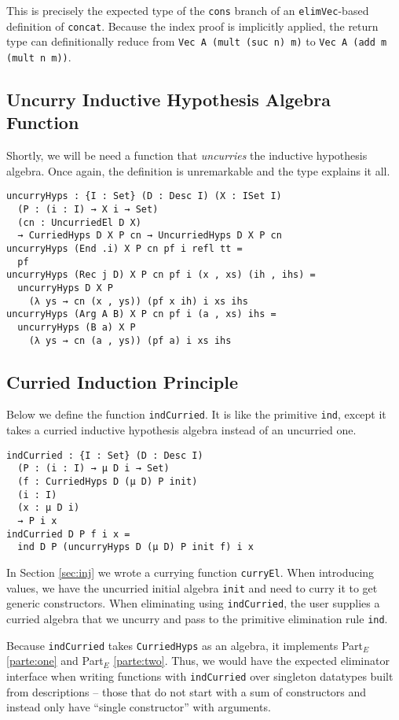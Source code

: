 \documentclass[nonatbib]{sigplanconf}
\newcommand{\refsec}[1]{Section \ref{sec:#1}}
\newcommand{\refparte}[1]{Part$_E$ \ref{parte:#1}}
\begin{document}
This is precisely the expected type of the {\tt cons} branch of
an {\tt elimVec}-based definition of {\tt concat}. Because the index
proof is implicitly applied, the return type can definitionally
reduce from {\tt Vec A (mult (suc n) m)}
to {\tt Vec A (add m (mult n m))}.

\subsection{Uncurry Inductive Hypothesis Algebra Function}

Shortly, we will be need a function that {\it uncurries} the inductive
hypothesis algebra. Once again, the definition is unremarkable and the
type explains it all.

\begin{verbatim}
uncurryHyps : {I : Set} (D : Desc I) (X : ISet I)
  (P : (i : I) → X i → Set)
  (cn : UncurriedEl D X)
  → CurriedHyps D X P cn → UncurriedHyps D X P cn
uncurryHyps (End .i) X P cn pf i refl tt =
  pf
uncurryHyps (Rec j D) X P cn pf i (x , xs) (ih , ihs) =
  uncurryHyps D X P
    (λ ys → cn (x , ys)) (pf x ih) i xs ihs
uncurryHyps (Arg A B) X P cn pf i (a , xs) ihs =
  uncurryHyps (B a) X P
    (λ ys → cn (a , ys)) (pf a) i xs ihs
\end{verbatim}

\subsection{Curried Induction Principle}

Below we define
the function {\tt indCurried}. It is like the primitive {\tt ind},
except it takes a curried inductive hypothesis algebra instead of an
uncurried one. 

\begin{verbatim}
indCurried : {I : Set} (D : Desc I)
  (P : (i : I) → μ D i → Set)
  (f : CurriedHyps D (μ D) P init)
  (i : I)
  (x : μ D i)
  → P i x
indCurried D P f i x =
  ind D P (uncurryHyps D (μ D) P init f) i x
\end{verbatim}

In \refsec{inj} we wrote a currying function
{\tt curryEl}. When introducing values, we have the uncurried initial
algebra {\tt init} and need to curry it to get generic constructors.
When eliminating using {\tt indCurried},
the user supplies a curried algebra that we uncurry
and pass to the primitive elimination rule {\tt ind}.

Because
{\tt indCurried} takes {\tt CurriedHyps} as an algebra, it implements
\refparte{one} and \refparte{two}.
Thus, we would have the expected eliminator interface when writing
functions with {\tt indCurried} over singleton datatypes built from
descriptions -- those that do not start with a sum of constructors and
instead only have ``single constructor'' with arguments.
\end{document}
